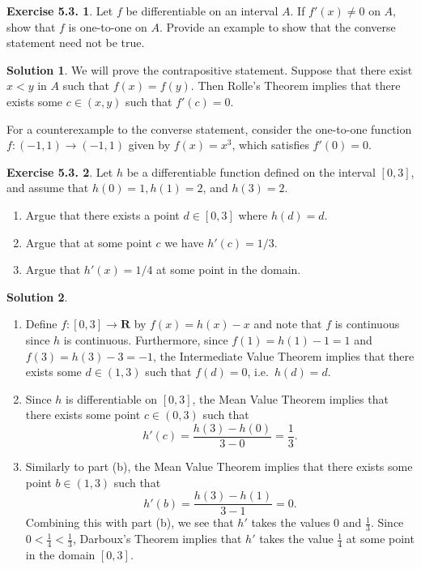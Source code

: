 \documentclass[12pt]{article}
\theoremstyle{definition}
\theoremstyle{exercise}
\newtheorem{exercise}{Exercise 5.3.}
\theoremstyle{solution}
\newtheorem*{solution}{Solution}
\newcommand{\R}{\mathbf{R}}
\begin{document}
\begin{exercise}
\label{ex:2}
    Let \( f \) be differentiable on an interval \( A \). If \( f'(x) \neq 0 \) on \( A \), show that \( f \) is one-to-one on \( A \). Provide an example to show that the converse statement need not be true.
\end{exercise}

\begin{solution}
    We will prove the contrapositive statement. Suppose that there exist \( x < y \) in \( A \) such that \( f(x) = f(y) \). Then Rolle's Theorem implies that there exists some \( c \in (x, y) \) such that \( f'(c) = 0 \).

    For a counterexample to the converse statement, consider the one-to-one function \( f : (-1, 1) \to (-1, 1) \) given by \( f(x) = x^3 \), which satisfies \( f'(0) = 0 \).
\end{solution}

\begin{exercise}
\label{ex:3}
    Let \( h \) be a differentiable function defined on the interval \( [0, 3] \), and assume that \( h(0) = 1, h(1) = 2 \), and \( h(3) = 2 \).
    \begin{enumerate}
        \item Argue that there exists a point \( d \in [0, 3] \) where \( h(d) = d \).

        \item Argue that at some point \( c \) we have \( h'(c) = 1/3 \).

        \item Argue that \( h'(x) = 1/4 \) at some point in the domain.
    \end{enumerate}
\end{exercise}

\begin{solution}
    \begin{enumerate}
        \item Define \( f : [0, 3] \to \R \) by \( f(x) = h(x) - x \) and note that \( f \) is continuous since \( h \) is continuous. Furthermore, since \( f(1) = h(1) - 1 = 1 \) and \( f(3) = h(3) - 3 = -1 \), the Intermediate Value Theorem implies that there exists some \( d \in (1, 3) \) such that \( f(d) = 0 \), i.e.\ \( h(d) = d \).

        \item Since \( h \) is differentiable on \( [0, 3] \), the Mean Value Theorem implies that there exists some point \( c \in (0, 3) \) such that
        \[
            h'(c) = \frac{h(3) - h(0)}{3 - 0} = \frac{1}{3}.
        \]

        \item Similarly to part (b), the Mean Value Theorem implies that there exists some point \( b \in (1, 3) \) such that
        \[
            h'(b) = \frac{h(3) - h(1)}{3 - 1} = 0.
        \]
        Combining this with part (b), we see that \( h' \) takes the values \( 0 \) and \( \tfrac{1}{3} \). Since \( 0 < \tfrac{1}{4} < \tfrac{1}{3} \), Darboux's Theorem implies that \( h' \) takes the value \( \tfrac{1}{4} \) at some point in the domain \( [0, 3] \).
    \end{enumerate}
\end{solution}
\end{document}
